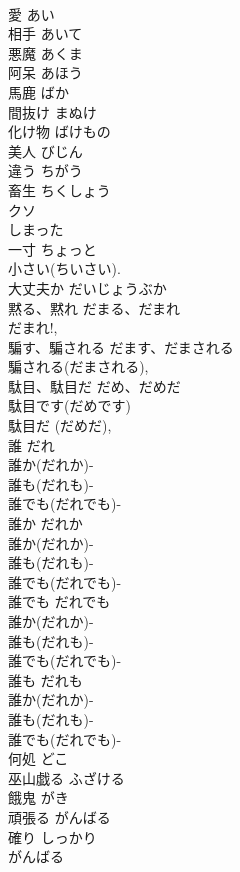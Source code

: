 \documentclass[8pt]{extreport}
\begin{document}
\begin{CJK}{UTF8}{min}
\\	愛	あい	
\\	相手	あいて	
\\	悪魔	あくま	
\\	阿呆	あほう	
\\	馬鹿	ばか	
\\	間抜け	まぬけ	
\\	化け物	ばけもの	
\\	美人	びじん	
\\	違う	ちがう	
\\	畜生	ちくしょう	
\\	クソ 
\\	しまった	
\\	一寸	ちょっと	
\\	小さい(ちいさい). 
\\	大丈夫か	だいじょうぶか	
\\	黙る、黙れ	だまる、だまれ	
\\	だまれ!, 
\\	騙す、騙される	だます、だまされる	
\\	騙される(だまされる), 
\\	駄目、駄目だ	だめ、だめだ	
\\	駄目です(だめです) 
\\	駄目だ (だめだ), 
\\	誰	だれ	
\\	誰か(だれか)-
\\	誰も(だれも)-
\\	誰でも(だれでも)-
\\	誰か	だれか	
\\	誰か(だれか)-
\\	誰も(だれも)-
\\	誰でも(だれでも)-
\\	誰でも	だれでも	
\\	誰か(だれか)-
\\	誰も(だれも)-
\\	誰でも(だれでも)-
\\	誰も	だれも	
\\	誰か(だれか)-
\\	誰も(だれも)-
\\	誰でも(だれでも)-
\\	何処	どこ	
\\	巫山戯る	ふざける	
\\	餓鬼	がき	
\\	頑張る	がんばる	
\\	確り	しっかり	
\\	がんばる 

\end{CJK}
\end{document}
